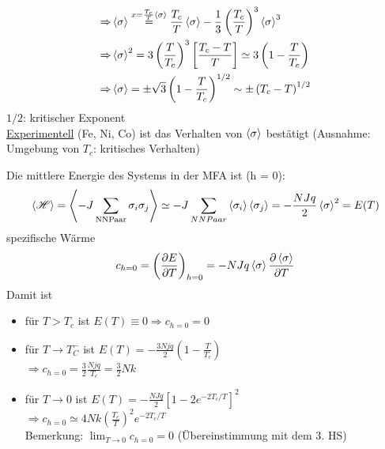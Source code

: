 \begin{enumerate}[A)]
\begin{enumerate}[i)]
\begin{equation}
\begin{split}
                \Rightarrow &\left\langle\sigma\right\rangle \overset{x=\frac{T_c}{T}\left\langle\sigma\right\rangle}{=} \frac{T_c}{T} \left\langle\sigma\right\rangle - \frac{1}{3} \left( \frac{T_c}{T} \right)^3 \left\langle\sigma\right\rangle^3 \\
                \Rightarrow &\left\langle\sigma\right\rangle^2 = 3 \left( \frac{T}{T_c} \right)^3 \left[ \frac{T_c - T}{T} \right] \simeq 3 \left( 1 - \frac{T}{T_c} \right) \\
                \Rightarrow &\left\langle\sigma\right\rangle = \pm \sqrt{3} \left( 1 - \frac{T}{T_c} \right)^{1/2} \sim \pm \left( T_c - T \right)^{1/2}
            \end{split}
        \end{equation}
        $1/2$: kritischer Exponent \\
        \underline{Experimentell} (Fe, Ni, Co) ist das Verhalten von $\left\langle\sigma\right\rangle$ bestätigt (Ausnahme: Umgebung von $T_c$: kritisches Verhalten)
    \end{enumerate}
    Die mittlere Energie des Systems in der MFA ist (h = 0):
    \begin{equation}
        \left\langle\mathscr{H}\right\rangle = \left\langle- J \sum_\text{NNPaar} \sigma_i \sigma_j\right\rangle \simeq - J \sum_{NN Paar} \left\langle\sigma_i\right\rangle \left\langle\sigma_j\right\rangle = - \frac{N J q}{2} \left\langle\sigma\right\rangle^2 = E(T)
    \end{equation}
    spezifische Wärme
    \begin{equation}
        \label{eq:MFA_specHeat}
        c_{h=0} = \left( \frac{\partial E}{\partial T} \right)_{h=0} = - N J q \left\langle\sigma\right\rangle \frac{\partial \left\langle\sigma\right\rangle}{\partial T}
    \end{equation}
    Damit ist
    \begin{itemize}
        \item für $T > T_c$ ist $E(T) \equiv 0 \Rightarrow c_{h=0} = 0$
        \item für $T \to T_C^-$ ist $E(T) = - \frac{3 N j q}{2} \left( 1 - \frac{T}{T_c} \right)$ \\
        $\Rightarrow c_{h=0} = \frac{3}{2} \frac{N j q}{T_c} = \frac{3}{2} N k$
        \item für $T \to 0$ ist $E(T) = - \frac{N J q}{2} \left[ 1 - 2 e^{-2 T_c / T} \right]^2$ \\
        $\Rightarrow c_{h=0} \simeq 4 N k \left( \frac{T_c}{T} \right)^2 e^{-2 T_c / T}$ \\
        Bemerkung: $\lim_{T \to 0} c_{h = 0} = 0$ (Übereinstimmung mit dem 3. HS)
    \end{itemize}
    \begin{figure}[H]
        \centering
        \def\svgwidth{0.4\textwidth}
        

\end{figure}
\end{enumerate}
